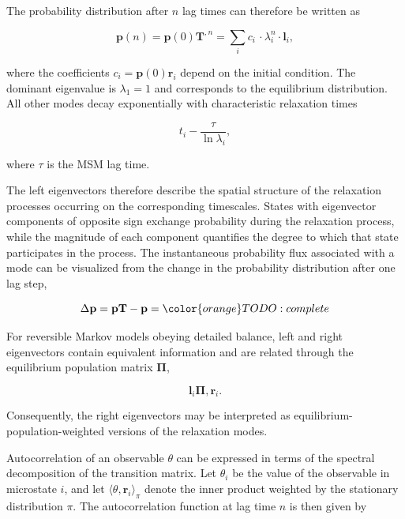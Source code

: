 The probability distribution after $n$ lag times can therefore be written as

\begin{equation*}
\mathbf{p}(n)=
\mathbf{p}(0)\mathbf{T}^{,n}=
\sum_i
c_i\, \cdot \lambda_i^n \cdot \mathbf{l}_i,
\end{equation*}

where the coefficients $c_i = \mathbf{p}(0)\mathbf{r}_i$ depend on the initial condition. The dominant eigenvalue is $\lambda_1=1$ and corresponds to the equilibrium distribution. All other modes decay exponentially with characteristic relaxation times

\begin{equation*}
t_i
-\frac{\tau}{\ln \lambda_i},
\end{equation*}

where $\tau$ is the MSM lag time.

The left eigenvectors therefore describe the spatial structure of the relaxation processes occurring on the corresponding timescales. States with eigenvector components of opposite sign exchange probability during the relaxation process, while the magnitude of each component quantifies the degree to which that state participates in the process. The instantaneous probability flux associated with a mode can be visualized from the change in the probability distribution after one lag step,

\begin{equation*}
\Delta\mathbf{p} = 
\mathbf{p}\mathbf{T} - \mathbf{p} = {\color{orange} TODO: complete}
\end{equation*}

For reversible Markov models obeying detailed balance, left and right eigenvectors contain equivalent information and are related through the equilibrium population matrix $\boldsymbol{\Pi}$,

\begin{equation*}
\mathbf{l}_i
\boldsymbol{\Pi},\mathbf{r}_i .
\end{equation*}

Consequently, the right eigenvectors may be interpreted as equilibrium-population-weighted versions of the relaxation modes.



Autocorrelation of an observable $\theta$ can be expressed in terms of the spectral decomposition of the transition matrix. Let $\theta_i$ be the value of the observable in microstate $i$, and let $\langle \theta, \mathbf{r}_i\rangle_\pi$ denote the inner product weighted by the stationary distribution $\pi$. The autocorrelation function at lag time $n$ is then given by

